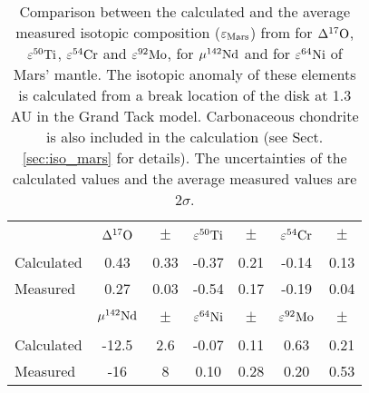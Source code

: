 \documentclass{aa}
\begin{document}
\begin{table*}
\centering
\caption{Comparison between the calculated and the average measured isotopic composition ($\varepsilon_{\rm Mars}$) from \cite{dauphas2017isotopic} for $\Delta^{17} \rm O$, $\varepsilon^{50} \rm Ti$, $\varepsilon^{54} \rm Cr$ and $\varepsilon^{92} \rm Mo$, \cite{kruijer2017early} for $\mu^{142} \rm Nd$ and \cite{brasser2018GRL} for $\varepsilon^{64} \rm Ni$ of Mars’ mantle. The isotopic anomaly of these elements is calculated from a break location of the disk at 1.3 AU in the Grand Tack model. Carbonaceous chondrite is also included in the calculation (see Sect. \ref{sec:iso_mars} for details). The uncertainties of the calculated values and the average measured values are 2$\sigma$.}
\label{tb:isotope}
\begin{tabular}{lcccccc}


\hline\hline\\
 & $\Delta^{17}\rm O$ & $\pm$ & $\varepsilon^{50}\rm Ti$ & $\pm$ & $\varepsilon^{54}\rm Cr$ & $\pm$ \\
\hline\\ 
Calculated & 0.43 & 0.33 & -0.37 & 0.21 & -0.14 & 0.13\\ 
Measured & 0.27 & 0.03 & -0.54 & 0.17 & -0.19 & 0.04\\
\hline\\
& $\mu^{142}\rm Nd$ & $\pm$ & $\varepsilon^{64}\rm Ni$ & $\pm$ & $\varepsilon^{92}\rm Mo$ & $\pm$\\
\hline\\  
Calculated & -12.5 & 2.6 & -0.07 & 0.11 & 0.63 & 0.21\\
Measured & -16 & 8 & 0.10 & 0.28 & 0.20 & 0.53 \\
\hline
\end{tabular}
\end{table*} 
\end{document}
